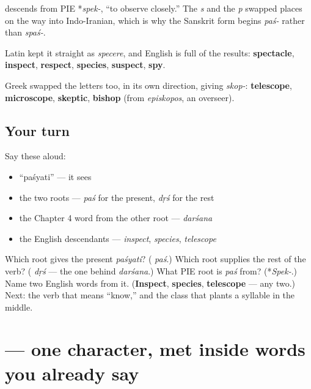 \begin{cousinweb}
\textbf{} descends from PIE *\emph{spek-}, \textquotedblleft{}to observe closely.\textquotedblright{} The \emph{s} and the \emph{p} swapped places on the way into Indo-Iranian, which is why the Sanskrit form begins \emph{paś-} rather than \emph{spaś-}.

Latin kept it straight as \emph{specere}, and English is full of the results: \textbf{spectacle}, \textbf{inspect}, \textbf{respect}, \textbf{species}, \textbf{suspect}, \textbf{spy}.

Greek swapped the letters too, in its own direction, giving \emph{skop-}: \textbf{telescope}, \textbf{microscope}, \textbf{skeptic}, \textbf{bishop} (from \emph{episkopos}, an overseer).
\end{cousinweb}

\subsection*{Your turn}
Say these aloud:

\begin{itemize}
\raggedright
  \item \textquotedblleft{}paśyati\textquotedblright{} — it sees
  \item the two roots — \emph{paś} for the present, \emph{dṛś} for the rest
  \item the Chapter 4 word from the other root — \emph{darśana}
  \item the English descendants — \emph{inspect}, \emph{species}, \emph{telescope}
\end{itemize}

\begin{tcolorbox}[breakable,colback=teal!4,colframe=teal!35!black,title={Before you move on}]
Which root gives the present \emph{paśyati}? (\textbf{} \emph{paś}.) Which root supplies the rest of the verb? (\textbf{} \emph{dṛś} — the one behind \emph{darśana}.) What PIE root is \emph{paś} from? (*\emph{Spek-}.) Name two English words from it. (\textbf{Inspect}, \textbf{species}, \textbf{telescope} — any two.) Next: the verb that means \textquotedblleft{}know,\textquotedblright{} and the class that plants a syllable in the middle.
\end{tcolorbox}
\section[\texorpdfstring{\sk{ख} (kha)}{ख (kha)}]{ — one character, met inside words you already say}

